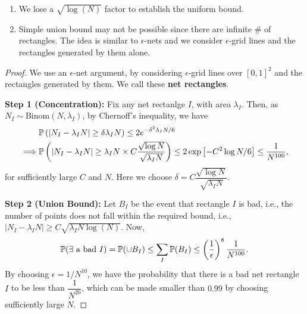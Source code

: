 \documentclass[12pt]{article}
\begin{document}
\begin{note}
    \begin{enumerate}
        \item We lose a $\sqrt{\log(N)}$ factor to establish the uniform bound.
        \item Simple union bound may not be possible since there are infinite \# of rectangles. The idea is similar to $\epsilon$-nets and we consider $\epsilon$-grid lines and the rectangles generated by them alone.
    \end{enumerate}
\end{note}

\begin{proof}
    We use an $\epsilon$-net argument, by considering $\epsilon$-grid lines over $[0, 1]^2$ and the rectangles generated by them. We call these \textbf{net rectangles}.

    \textbf{Step 1 (Concentration):} Fix any net rectanlge $I$, with area $\lambda_I$. Then, as $N_I \sim \text{Binom}(N, \lambda_I)$, by Chernoff's inequality, we have
    \begin{align*}
                 & \mathbb{P}\left( \vert N_I - \lambda_I N\vert \geq \delta \lambda_I N \right) \leq 2 e^{-\delta^2 \lambda_I N/6}                                                                            \\
        \implies & \mathbb{P}\left( \vert N_I - \lambda_I N\vert \geq \lambda_I N \times C \dfrac{\sqrt{\log N}}{\sqrt{\lambda_I N}} \right) \leq 2 \exp\left[ - C^2 \log N/6 \right] \leq \dfrac{1}{N^{100}},
    \end{align*}
    \noindent for sufficiently large $C$ and $N$. Here we choose $\delta = C \dfrac{\sqrt{\log N}}{\sqrt{\lambda_I N}}$.

    \textbf{Step 2 (Union Bound):} Let $B_I$ be the event that rectangle $I$ is bad, i.e., the number of points does not fall within the required bound, i.e., $\vert N_I - \lambda_I N\vert \geq C \sqrt{\lambda_I N \log(N)}$. Now,
    \begin{equation*}
        \mathbb{P}(\exists \text{ a bad } I) = \mathbb{P}(\cup B_I ) \leq \sum_I \mathbb{P}(B_I) \leq \left( \dfrac{1}{\epsilon} \right)^8 \dfrac{1}{N^{100}}.
    \end{equation*}
    \noindent By choosing $\epsilon = 1/N^{10}$, we have the probability that there is a bad net rectangle $I$ to be less than $\dfrac{1}{N^{20}}$, which can be made smaller than $0.99$ by choosing sufficiently large $N$.


\end{proof}
\end{document}
